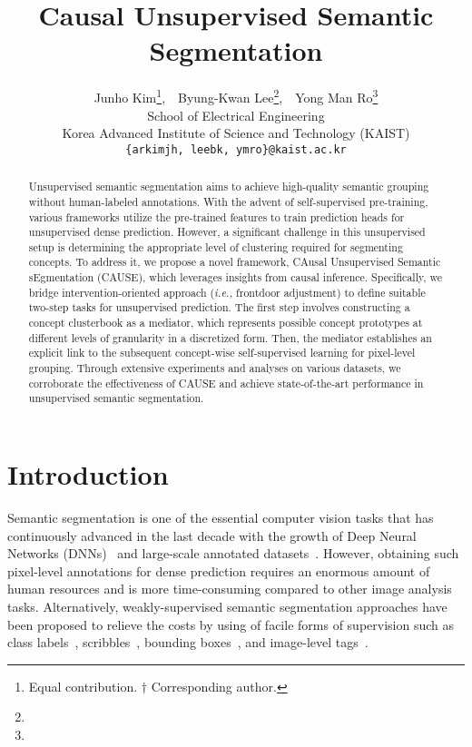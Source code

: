 \documentclass{article} \usepackage{iclr2024_conference,times}
\title{Causal Unsupervised Semantic Segmentation}
\author{Junho Kim\thanks{Equal contribution. $\dagger$ Corresponding author.},~~Byung-Kwan Lee\footnote[1]{},~~Yong Man Ro\footnote[2]{}\\
  School of Electrical Engineering \\
  Korea Advanced Institute of Science and Technology (KAIST) \\
  \texttt{\{arkimjh,~leebk,~ymro\}@kaist.ac.kr} \\
}
\begin{document}

\maketitle

\begin{abstract}
Unsupervised semantic segmentation aims to achieve high-quality semantic grouping without human-labeled annotations. With the advent of self-supervised pre-training, various frameworks utilize the pre-trained features to train prediction heads for unsupervised dense prediction. However, a significant challenge in this unsupervised setup is determining the appropriate level of clustering required for segmenting concepts. To address it, we propose a novel framework, CAusal Unsupervised Semantic sEgmentation (CAUSE), which leverages insights from causal inference. Specifically, we bridge intervention-oriented approach (\textit{i.e.,} frontdoor adjustment) to define suitable two-step tasks for unsupervised prediction. The first step involves constructing a concept clusterbook as a mediator, which represents possible concept prototypes at different levels of granularity in a discretized form. Then, the mediator establishes an explicit link to the subsequent concept-wise self-supervised learning for pixel-level grouping. Through extensive experiments and analyses on various datasets, we corroborate the effectiveness of CAUSE and achieve state-of-the-art performance in unsupervised semantic segmentation.
\end{abstract}

\section{Introduction}

\label{sec:1} 
Semantic segmentation is one of the essential computer vision tasks that has continuously advanced in the last decade with the growth of Deep Neural Networks (DNNs)~\citep{resnet, dosovitskiy2020image, carion2020end} and large-scale annotated datasets~\citep{everingham2010pascal, cordts2016cityscapes, caesar2018coco}. However, obtaining such pixel-level annotations for dense prediction requires an enormous amount of human resources and is more time-consuming compared to other image analysis tasks. Alternatively, weakly-supervised semantic segmentation approaches have been proposed to relieve the costs by using of facile forms of supervision such as class labels~\citep{wang2020self, zhang2020causal}, scribbles~\citep{lin2016scribblesup}, bounding boxes~\citep{dai2015boxsup, khoreva2017simple}, and image-level tags~\citep{xu2015learning, tang2018regularized}.
\end{document}
